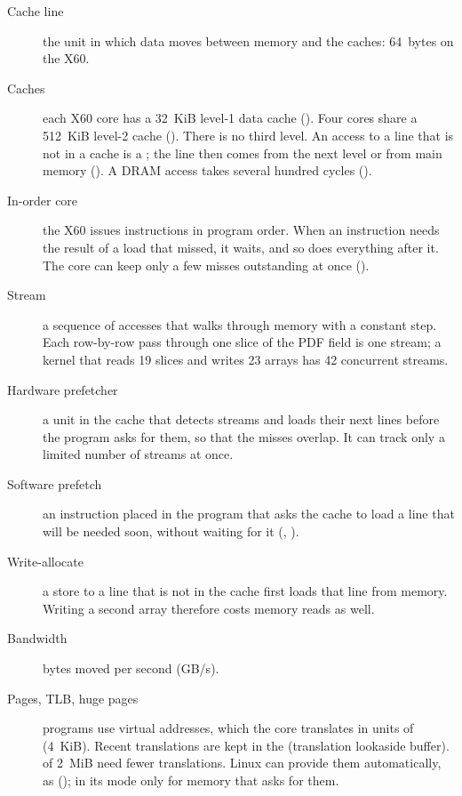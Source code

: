 \begin{description}
  \item[Cache line] the unit in which data moves between memory and the caches: 64~bytes on
        the X60.
  \item[Caches] each X60 core has a 32~KiB level-1 data cache (). Four cores share
        a 512~KiB level-2 cache (). There is no third level. An access to a line that
        is not in a cache is a ; the line then comes from the next level or from
        main memory (). A DRAM access takes several hundred cycles
        ().
  \item[In-order core] the X60 issues instructions in program order. When an instruction needs
        the result of a load that missed, it waits, and so does everything after it. The core
        can keep only a few misses outstanding at once ().
  \item[Stream] a sequence of accesses that walks through memory with a constant step. Each
        row-by-row pass through one slice of the PDF field is one stream; a kernel that reads
        19 slices and writes 23 arrays has 42 concurrent streams.
  \item[Hardware prefetcher] a unit in the cache that detects streams and loads their next
        lines before the program asks for them, so that the misses overlap. It can track only
        a limited number of streams at once.
  \item[Software prefetch] an instruction placed in the program that asks the cache to load a
        line that will be needed soon, without waiting for it (,
        ).
  \item[Write-allocate] a store to a line that is not in the cache first loads that line from
        memory. Writing a second array therefore costs memory reads as well.
  \item[Bandwidth] bytes moved per second (GB/s).
  \item[Pages, TLB, huge pages] programs use virtual addresses, which the core translates in
        units of  (4~KiB). Recent translations are kept in the 
        (translation lookaside buffer).  of 2~MiB need fewer translations.
        Linux can provide them automatically, as  ();
        in its  mode only for memory that asks for them.
\end{description}

